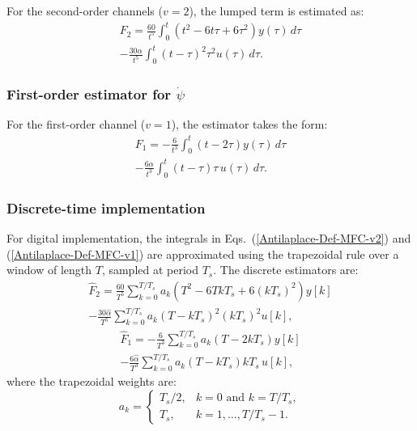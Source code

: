 \documentclass[sn-chicago,iicol]{sn-jnl}
\theoremstyle{thmstyleone}%
\theoremstyle{thmstyletwo}%
\theoremstyle{thmstylethree}%
\begin{document}
For the second-order channels ($v = 2$), the lumped term is estimated as:
\begin{multline}
    F_2 = \frac{60}{t^5}\int_{0}^{t}(t^2 - 6t\tau + 6\tau^2)
          y(\tau)\,d\tau \\
        - \frac{30\alpha}{t^5}\int_{0}^{t}(t-\tau)^2\tau^2
          u(\tau)\,d\tau.
    \label{Antilaplace-Def-MFC-v2}
\end{multline}

\subsubsection{First-order estimator for $\dot{\psi}$}

For the first-order channel ($v = 1$), the estimator takes the form:
\begin{multline}
    F_1 = -\frac{6}{t^3}\int_{0}^{t}(t - 2\tau)y(\tau)\,d\tau \\
          - \frac{6\alpha}{t^3}\int_{0}^{t}(t-\tau)\tau\, 
          u(\tau)\,d\tau.
    \label{Antilaplace-Def-MFC-v1}
\end{multline}

\subsubsection{Discrete-time implementation}

For digital implementation, the integrals in 
Eqs.~(\ref{Antilaplace-Def-MFC-v2}) and (\ref{Antilaplace-Def-MFC-v1}) 
are approximated using the trapezoidal rule over a window of length $T$, 
sampled at period $T_s$. The discrete estimators are:
\begin{multline}
    \hat{F}_2 = \frac{60}{T^5}\sum_{k=0}^{T/T_s} a_k
                (T^2 - 6TkT_s + 6(kT_s)^2)y[k] \\
              - \frac{30\hat{\alpha}}{T^5}\sum_{k=0}^{T/T_s} 
                a_k(T - kT_s)^2(kT_s)^2 u[k],
\end{multline}
\begin{multline}
    \hat{F}_1 = -\frac{6}{T^3}\sum_{k=0}^{T/T_s} 
                a_k(T - 2kT_s)y[k] \\
              - \frac{6\hat{\alpha}}{T^3}\sum_{k=0}^{T/T_s}
                a_k(T - kT_s)kT_s\, u[k],
\end{multline}
where the trapezoidal weights are:
\begin{equation}
    a_k = \begin{cases}
        T_s/2, & k = 0 \text{ and } k = T/T_s, \\
        T_s,   & k = 1, \dots, T/T_s - 1.
    \end{cases}
\end{equation}
\end{document}
